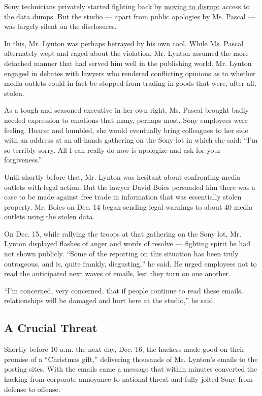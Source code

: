 Sony technicians privately started fighting back by
\href{http://recode.net/2014/12/10/sony-pictures-tries-to-disrupt-downloads-of-its-stolen-files/}{moving
to disrupt} access to the data dumps. But the studio --- apart from
public apologies by Ms. Pascal --- was largely silent on the
disclosures.

In this, Mr. Lynton was perhaps betrayed by his own cool. While Ms.
Pascal alternately wept and raged about the violation, Mr. Lynton
assumed the more detached manner that had served him well in the
publishing world. Mr. Lynton engaged in debates with lawyers who
rendered conflicting opinions as to whether media outlets could in fact
be stopped from trading in goods that were, after all, stolen.

As a tough and seasoned executive in her own right, Ms. Pascal brought
badly needed expression to emotions that many, perhaps most, Sony
employees were feeling. Hoarse and humbled, she would eventually bring
colleagues to her side with an address at an all-hands gathering on the
Sony lot in which she said: ``I'm so terribly sorry. All I can really do
now is apologize and ask for your forgiveness.''

Until shortly before that, Mr. Lynton was hesitant about confronting
media outlets with legal action. But the lawyer David Boies persuaded
him there was a case to be made against free trade in information that
was essentially stolen property. Mr. Boies on Dec. 14 began sending
legal warnings to about 40 media outlets using the stolen data.

On Dec. 15, while rallying the troops at that gathering on the Sony lot,
Mr. Lynton displayed flashes of anger and words of resolve --- fighting
spirit he had not shown publicly. ``Some of the reporting on this
situation has been truly outrageous, and is, quite frankly,
disgusting,'' he said. He urged employees not to read the anticipated
next waves of emails, lest they turn on one another.

``I'm concerned, very concerned, that if people continue to read these
emails, relationships will be damaged and hurt here at the studio,'' he
said.

\hypertarget{a-crucial-threat}{%
\subsection{A Crucial Threat}\label{a-crucial-threat}}

Shortly before 10 a.m. the next day, Dec. 16, the hackers made good on
their promise of a ``Christmas gift,'' delivering thousands of Mr.
Lynton's emails to the posting sites. With the emails came a message
that within minutes converted the hacking from corporate annoyance to
national threat and fully jolted Sony from defense to offense.


